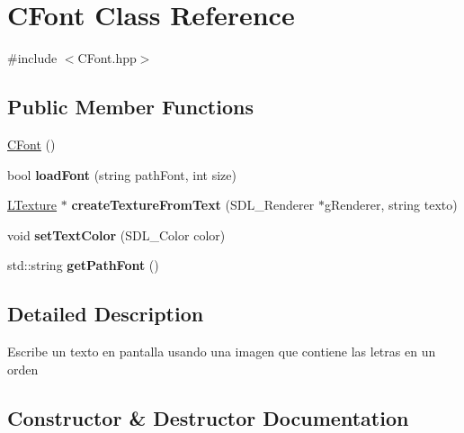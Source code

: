 \hypertarget{class_c_font}{}\section{C\+Font Class Reference}
\label{class_c_font}


{\ttfamily \#include $<$C\+Font.\+hpp$>$}

\subsection*{Public Member Functions}
\begin{DoxyCompactItemize}
\item 
\hyperlink{class_c_font_a3f49893acc711805888c11aa8e931666}{C\+Font} ()
\item 
bool {\bfseries load\+Font} (string path\+Font, int size)\hypertarget{class_c_font_a85d82f9d94ccc313de3afc6a01798a0e}{}\label{class_c_font_a85d82f9d94ccc313de3afc6a01798a0e}

\item 
\hyperlink{class_l_texture}{L\+Texture} $\ast$ {\bfseries create\+Texture\+From\+Text} (S\+D\+L\+\_\+\+Renderer $\ast$g\+Renderer, string texto)\hypertarget{class_c_font_ab4d6760a2c774a562fc694145c3705e7}{}\label{class_c_font_ab4d6760a2c774a562fc694145c3705e7}

\item 
void {\bfseries set\+Text\+Color} (S\+D\+L\+\_\+\+Color color)\hypertarget{class_c_font_ae793580013df4543d4f3c51c96676152}{}\label{class_c_font_ae793580013df4543d4f3c51c96676152}

\item 
std\+::string {\bfseries get\+Path\+Font} ()\hypertarget{class_c_font_afde5392ae1f78e95537dc09078397392}{}\label{class_c_font_afde5392ae1f78e95537dc09078397392}

\end{DoxyCompactItemize}


\subsection{Detailed Description}
Escribe un texto en pantalla usando una imagen que contiene las letras en un orden 

\subsection{Constructor \& Destructor Documentation}
